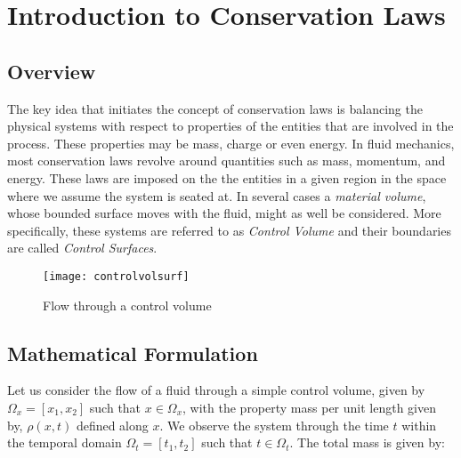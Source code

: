 \documentclass[11pt, a4paper]{report}
\begin{document}
\begin{titlepage}
\tableofcontents
\end{titlepage}
\listoffigures
\cleardoublepage






\chapter{Introduction to Conservation Laws}

\section{Overview}
The key idea that initiates the concept of conservation laws is balancing the physical systems with respect to
properties of the entities that are involved in the process. These properties may be mass, charge or even energy. 
In fluid mechanics, most conservation laws revolve around quantities such as mass, momentum, and energy. These laws
are imposed on the the entities in a given region in the space where we assume the system is seated at. In several
cases a \emph{material volume}, whose bounded surface moves with the fluid, might as well be considered. More
specifically, these systems are referred to as \emph{Control Volume} and their boundaries are called \emph{Control
Surfaces}.

\begin{figure}[h]
    \centering
    \texttt{[image: controlvolsurf]}
    \caption{Flow through a control volume}
    \label{fig:controlvolsurf}
\end{figure}



\section{Mathematical Formulation}
Let us consider the flow of a fluid through a simple control volume, given by $\Omega_x = [x_1, x_2]$ such that $x\in\Omega_x$,
with the property mass per unit length given by, $\rho(x, t)$ defined along $x$. We observe the system through the
time $t$ within the temporal domain $\Omega_t = [t_1, t_2]$ such that $t\in\Omega_t$. The total mass is given by:
\end{document}
